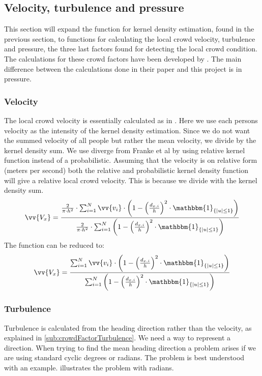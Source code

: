 
\subsection{Velocity, turbulence and pressure}
This section will expand the function for kernel density estimation, found in the previous section, to functions for calculating the local crowd velocity, turbulence and pressure, the three last factors found for detecting the local crowd condition. The calculations for these crowd factors have been developed by \citet{wirz2012inferring}. The main difference between the calculations done in their paper and this project is in pressure. 

\subsubsection{Velocity}
The local crowd velocity is essentially calculated as in \citet{wirz2012inferring}. Here we use each persons velocity as the intensity of the kernel density estimation. Since we do not want the summed velocity of all people but rather the mean velocity, we divide by the kernel density sum. We use diverge from Franke et al by using relative kernel function instead of a probabilistic. Assuming that the velocity is on relative form (meters per second) both the relative and probabilistic kernel density function will give a relative local crowd velocity. This is because we divide with the kernel density sum. 
\begin{equation}
\label{eq:}
\vv{V_x} = \frac{\frac{2}{\pi \cdot h^2} \cdot \sum_{i=1}^N \vv{v_i} \cdot \left(1-\left(\frac{d_{x,i}}{h}\right)^2 \cdot \mathbbm{1}_{\{|u| \leq 1\} }\right)}{\frac{2}{\pi \cdot h^2} \cdot \sum_{i=1}^N \left(1-\left(\frac{d_{x,i}}{h}\right)^2 \cdot \mathbbm{1}_{\{|u| \leq 1\} }\right)}
\end{equation}
The function can be reduced to:
\begin{equation}
\label{eq:}
\vv{V_x} = \frac{\sum_{i=1}^N \vv{v_i} \cdot \left(1-\left(\frac{d_{x,i}}{h}\right)^2 \cdot \mathbbm{1}_{\{|u| \leq 1\} }\right)}{\sum_{i=1}^N \left(1-\left(\frac{d_{x,i}}{h}\right)^2 \cdot \mathbbm{1}_{\{|u| \leq 1\} }\right)}
\end{equation}

\subsubsection{Turbulence}
Turbulence is calculated from the heading direction rather than the velocity, as explained in \cref{sub:crowdFactorTurbulence}. We need a way to represent a direction. When trying to find the mean heading direction a problem arises if we are using standard cyclic degrees or radians. The problem is best understood with an example.  illustrates the problem with radians.

